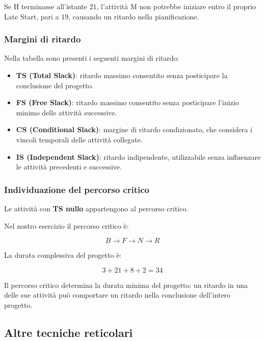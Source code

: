 \noindent Se H terminasse all'istante 21, l'attività M
non potrebbe iniziare entro il proprio Late Start,
pari a 19, causando un ritardo nella pianificazione.

\subsubsection*{Margini di ritardo}

\noindent Nella tabella sono presenti i seguenti
margini di ritardo:

\begin{itemize}
    \item \textbf{TS (Total Slack)}: ritardo massimo
    consentito senza posticipare la conclusione del progetto.

    \item \textbf{FS (Free Slack)}: ritardo massimo
    consentito senza posticipare l'inizio minimo
    delle attività successive.

    \item \textbf{CS (Conditional Slack)}: margine
    di ritardo condizionato, che considera i vincoli
    temporali delle attività collegate.

    \item \textbf{IS (Independent Slack)}: ritardo
    indipendente, utilizzabile senza influenzare
    le attività precedenti e successive.
\end{itemize}

\subsubsection*{Individuazione del percorso critico}

\noindent Le attività con \textbf{TS nullo}
appartengono al percorso critico.

\medskip

\noindent Nel nostro esercizio il percorso critico è:

\[
\boxed{B \rightarrow F \rightarrow N \rightarrow R}
\]

\noindent La durata complessiva del progetto è:

\[
3+21+8+2=\boxed{34}
\]

\noindent Il percorso critico determina la durata minima
del progetto: un ritardo in una delle sue attività
può comportare un ritardo nella conclusione dell'intero progetto.
\subsection{Altre tecniche reticolari}

